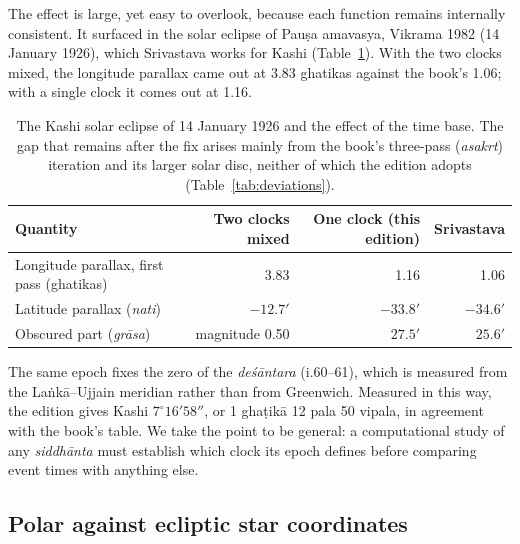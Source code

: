 \documentclass[11pt,a4paper]{article}
\begin{document}
The effect is large, yet easy to overlook, because each function remains internally consistent. It surfaced in the solar eclipse of Pau\d{s}a amavasya, Vikrama 1982 (14 January 1926), which Srivastava works for Kashi (Table~\ref{tab:kashi}). With the two clocks mixed, the longitude parallax came out at 3.83 ghatikas against the book's 1.06; with a single clock it comes out at 1.16.

\begin{table}[ht]
\centering
\caption{The Kashi solar eclipse of 14 January 1926 and the effect of the time base. The gap that remains after the fix arises mainly from the book's three-pass (\textit{asakrt}) iteration and its larger solar disc, neither of which the edition adopts (Table~\ref{tab:deviations}).}
\label{tab:kashi}
\small
\begin{tabular}{@{}lrrr@{}}
\toprule
Quantity & Two clocks mixed & One clock (this edition) & Srivastava \\
\midrule
Longitude parallax, first pass (ghatikas) & 3.83 & 1.16 & 1.06 \\
Latitude parallax (\textit{nati}) & $-12.7'$ & $-33.8'$ & $-34.6'$ \\
Obscured part (\textit{gr\=asa}) & magnitude 0.50 & $27.5'$ & $25.6'$ \\
\bottomrule
\end{tabular}
\end{table}

The same epoch fixes the zero of the \textit{de\'s\=antara} (i.60--61), which is measured from the La\.nk\=a--Ujjain meridian rather than from Greenwich. Measured in this way, the edition gives Kashi $7^\circ16'58''$, or 1 gha\d{t}ik\=a 12 pala 50 vipala, in agreement with the book's table. We take the point to be general: a computational study of any \textit{siddh\=anta} must establish which clock its epoch defines before comparing event times with anything else.

\subsection{Polar against ecliptic star coordinates}
\label{sec:polar}
\end{document}
